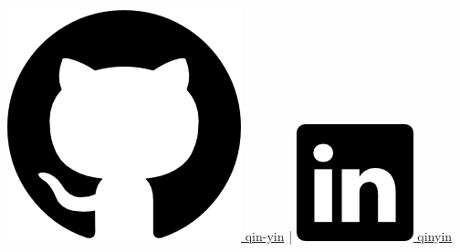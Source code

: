 \documentclass{letter}
\begin{document}
\begin{center}
{			\href{https://github.com/qin-yin}{\includegraphics[scale=0.03]{icons/github.png} \hspace{0pt} qin-yin} \hspace{2pt} | \hspace{2pt} 
			\href{https://linkedin.com/in/qinyin}{\includegraphics[scale=0.055]{icons/linkedin.png} \hspace{1pt} qinyin}}
	\end{center}
	
\end{document}
